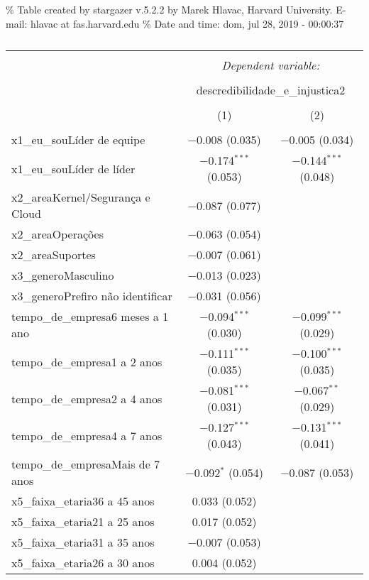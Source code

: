 \documentclass[]{book}
\begin{document}
\% Table created by stargazer v.5.2.2 by Marek Hlavac, Harvard University. E-mail: hlavac at fas.harvard.edu
\% Date and time: dom, jul 28, 2019 - 00:00:37

\begin{table}[!htbp] \centering 
  \caption{} 
  \label{} 
\begin{tabular}{@{\extracolsep{5pt}}lcc} 
\\[-1.8ex]\hline 
\hline \\[-1.8ex] 
 & \multicolumn{2}{c}{\textit{Dependent variable:}} \\ 
\cline{2-3} 
\\[-1.8ex] & \multicolumn{2}{c}{descredibilidade\_e\_injustica2} \\ 
\\[-1.8ex] & (1) & (2)\\ 
\hline \\[-1.8ex] 
 x1\_eu\_souLíder de equipe & $-$0.008 (0.035) & $-$0.005 (0.034) \\ 
  x1\_eu\_souLíder de líder & $-$0.174$^{***}$ (0.053) & $-$0.144$^{***}$ (0.048) \\ 
  x2\_areaKernel/Segurança e Cloud & $-$0.087 (0.077) &  \\ 
  x2\_areaOperações & $-$0.063 (0.054) &  \\ 
  x2\_areaSuportes & $-$0.007 (0.061) &  \\ 
  x3\_generoMasculino & $-$0.013 (0.023) &  \\ 
  x3\_generoPrefiro não identificar & $-$0.031 (0.056) &  \\ 
  tempo\_de\_empresa6 meses a 1 ano & $-$0.094$^{***}$ (0.030) & $-$0.099$^{***}$ (0.029) \\ 
  tempo\_de\_empresa1 a 2 anos & $-$0.111$^{***}$ (0.035) & $-$0.100$^{***}$ (0.035) \\ 
  tempo\_de\_empresa2 a 4 anos & $-$0.081$^{***}$ (0.031) & $-$0.067$^{**}$ (0.029) \\ 
  tempo\_de\_empresa4 a 7 anos & $-$0.127$^{***}$ (0.043) & $-$0.131$^{***}$ (0.041) \\ 
  tempo\_de\_empresaMais de 7 anos & $-$0.092$^{*}$ (0.054) & $-$0.087 (0.053) \\ 
  x5\_faixa\_etaria36 a 45 anos & 0.033 (0.052) &  \\ 
  x5\_faixa\_etaria21 a 25 anos & 0.017 (0.052) &  \\ 
  x5\_faixa\_etaria31 a 35 anos & $-$0.007 (0.053) &  \\ 
  x5\_faixa\_etaria26 a 30 anos & 0.004 (0.052) &  \\ 

\end{tabular}
\end{table}
\end{document}
